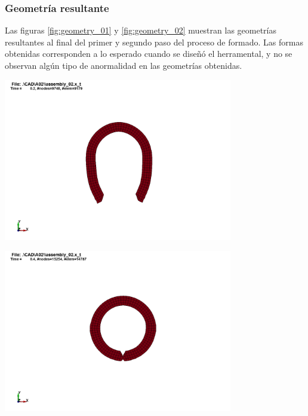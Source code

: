\subsubsection{Geometría resultante}



Las figuras \ref{fig:geometry_01} y \ref{fig:geometry_02} muestran las geometrías 
resultantes al final del primer y segundo paso del proceso de formado. Las formas 
obtenidas corresponden a lo esperado cuando se diseñó el herramental, y no se observan 
algún tipo de anormalidad en las geometrías obtenidas.

\begin{center}
\includegraphics[width=0.75\textwidth]{src/ch4/geometry_01.png}
\label{fig:geometry_01}
\end{center}

\begin{center}
\includegraphics[width=0.75\textwidth]{src/ch4/geometry_02.png}
\label{fig:geometry_02}
\end{center}


